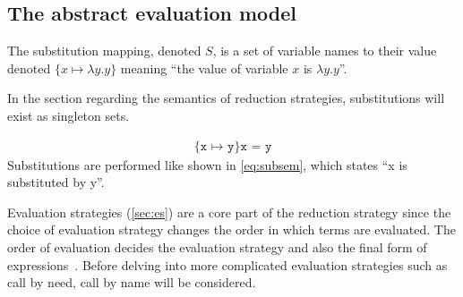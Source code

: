 \documentclass[11pt,oneside,a4paper]{report}
\begin{document}
\subsection{The abstract evaluation model}
The substitution mapping, denoted $S$, is a set of variable names to their value denoted $\{ x \mapsto \lambda y . y \}$ meaning ``the value of variable $x$ is $\lambda y . y$''.
\begin{remark}
  In the section regarding the semantics of reduction strategies, substitutions will exist as singleton sets.
\end{remark}
\begin{align}
  \texttt{\{x $\mapsto$ y\}x = y}\label{eq:subsem}
\end{align}
Substitutions are performed like shown in \autoref{eq:subsem}, which states ``x is substituted by y''.

Evaluation strategies (\autoref{sec:es}) are a core part of the reduction strategy since the choice of evaluation strategy changes the order in which terms are evaluated.
The order of evaluation decides the evaluation strategy and also the final form of expressions~\cite{sestoft2002demonstrating}.
Before delving into more complicated evaluation strategies such as call by need, call by name will be considered.
\end{document}
